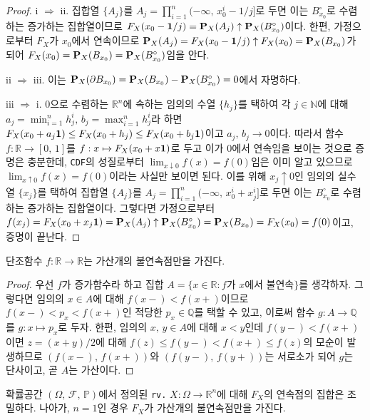 \begin{proof}
    i $\Rightarrow$ ii. 집합열 $\{A_j\}$를 $A_j=\prod_{i=1}^n(-\infty,\,x_0^i-1/j]$로 두면 이는 $B_{x_0}^\circ$로 수렴하는 증가하는 집합열이므로 $F_X(x_0-\mathbf{1}/j)=\mathbf{P}_X(A_j)\uparrow\mathbf{P}_X(B_{x_0}^\circ)$이다. 한편, 가정으로부터 $F_X$가 $x_0$에서 연속이므로 $\mathbf{P}_X(A_j)=F_X(x_0-\mathbf{1}/j)\uparrow F_X(x_0)=\mathbf{P}_X(B_{x_0})$가 되어 $F_X(x_0)=\mathbf{P}_X(B_{x_0})=\mathbf{P}_X(B_{x_0}^\circ)$임을 안다.

    ii $\Rightarrow$ iii. 이는 $\mathbf{P}_X(\partial B_{x_0})=\mathbf{P}_X(B_{x_0})-\mathbf{P}_X(B_{x_0}^\circ)=0$에서 자명하다.

    iii $\Rightarrow$ i. $0$으로 수렴하는 $\mathbb{R}^n$에 속하는 임의의 수열 $\{h_j\}$를 택하여 각 $j\in\mathbb{N}$에 대해 $a_j=\min_{i=1}^nh_j^i,\,b_j=\max_{i=1}^nh_j^i$라 하면 $F_X(x_0+a_j\mathbf{1})\leq F_X(x_0+h_j)\leq F_X(x_0+b_j\mathbf{1})$이고 $a_j,\,b_j\to 0$이다. 따라서 함수 $f:\mathbb{R}\to[0,\,1]$를 $f:x\mapsto F_X(x_0+x\mathbf{1})$로 두고 이가 $0$에서 연속임을 보이는 것으로 증명은 충분한데, \texttt{CDF}의 성질로부터 $\lim_{x\downarrow0}f(x)=f(0)$임은 이미 알고 있으므로 $\lim_{x\uparrow0}f(x)=f(0)$이라는 사실만 보이면 된다. 이를 위해 $x_j\uparrow0$인 임의의 실수열 $\{x_j\}$를 택하여 집합열 $\{A_j\}$를 $A_j=\prod_{i=1}^n(-\infty,\,x_0^i+x_j^i]$로 두면 이는 $B_{x_0}^\circ$로 수렴하는 증가하는 집합열이다. 그렇다면 가정으로부터 $f(x_j)=F_X(x_0+x_j\mathbf{1})=\mathbf{P}_X(A_j)\uparrow\mathbf{P}_X(B_{x_0}^\circ)=\mathbf{P}_X(B_{x_0})=F_X(x_0)=f(0)$이고, 증명이 끝난다.
\end{proof}

\begin{lemma}\label{lem:monotoneDiscontinuity}
    단조함수 $f:\mathbb{R}\to\mathbb{R}$는 가산개의 불연속점만을 가진다.
\end{lemma}

\begin{proof}
    우선 $f$가 증가함수라 하고 집합 $A=\{x\in\mathbb{R}:f\textrm{가 $x$에서 불연속}\}$를 생각하자. 그렇다면 임의의 $x\in A$에 대해 $f(x-)<f(x+)$이므로 $f(x-)<p_x<f(x+)$인 적당한 $p_x\in\mathbb{Q}$를 택할 수 있고, 이로써 함수 $g:A\to\mathbb{Q}$를 $g:x\mapsto p_x$로 두자. 한편, 임의의 $x,\,y\in A$에 대해 $x<y$인데 $f(y-)<f(x+)$이면 $z=(x+y)/2$에 대해 $f(z)\leq f(y-)<f(x+)\leq f(z)$의 모순이 발생하므로 $(f(x-),\,f(x+))$와 $(f(y-),\,f(y+))$는 서로소가 되어 $g$는 단사이고, 곧 $A$는 가산이다.
\end{proof}

\begin{theorem}\label{thm:CDFContinuousDense}
    확률공간 $(\Omega,\,\mathcal{F},\,\mathbb{P})$에서 정의된 \texttt{rv.} $X:\Omega\to\mathbb{R}^n$에 대해 $F_X$의 연속점의 집합은 조밀하다. 나아가, $n=1$인 경우 $F_X$가 가산개의 불연속점만을 가진다.
\end{theorem}

